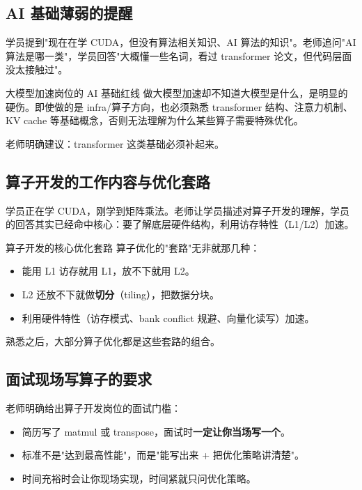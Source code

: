 \documentclass[a4paper]{article}
\begin{document}
\subsection{AI 基础薄弱的提醒}

学员提到"现在在学 CUDA，但没有算法相关知识、AI 算法的知识"。老师追问"AI 算法是哪一类"，学员回答"大概懂一些名词，看过 transformer 论文，但代码层面没太接触过"。

\begin{warningbox}{大模型加速岗位的 AI 基础红线}
做大模型加速却不知道大模型是什么，是明显的硬伤。即使做的是 infra/算子方向，也必须熟悉 transformer 结构、注意力机制、KV cache 等基础概念，否则无法理解为什么某些算子需要特殊优化。
\end{warningbox}

老师明确建议：transformer 这类基础必须补起来。

\subsection{算子开发的工作内容与优化套路}

学员正在学 CUDA，刚学到矩阵乘法。老师让学员描述对算子开发的理解，学员的回答其实已经命中核心：要了解底层硬件结构，利用访存特性（L1/L2）加速。

\begin{importantbox}{算子开发的核心优化套路}
算子优化的"套路"无非就那几种：
\begin{itemize}
\item 能用 L1 访存就用 L1，放不下就用 L2。
\item L2 还放不下就做\textbf{切分}（tiling），把数据分块。
\item 利用硬件特性（访存模式、bank conflict 规避、向量化读写）加速。
\end{itemize}
熟悉之后，大部分算子优化都是这些套路的组合。
\end{importantbox}

\subsection{面试现场写算子的要求}

老师明确给出算子开发岗位的面试门槛：

\begin{itemize}
\item 简历写了 matmul 或 transpose，面试时\textbf{一定让你当场写一个}。
\item 标准不是"达到最高性能"，而是"能写出来 + 把优化策略讲清楚"。
\item 时间充裕时会让你现场实现，时间紧就只问优化策略。
\end{itemize}
\end{document}
